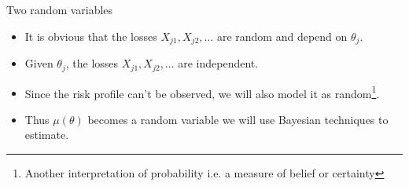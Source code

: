 \documentclass[11pt]{beamer}
\begin{document}
\begin{frame}{Two random variables}

\begin{itemize}
\item It is obvious that the losses $X_{j1},X_{j2},\ldots$ are random and depend on $\theta_j$.

\vfill


\item Given $\theta_j$, the losses $X_{j1},X_{j2},\ldots$ are independent.


\vfill



\item Since the risk profile can't be observed, we will also model it as random\footnote{Another interpretation of probability i.e. a measure of belief or certainty}.


\vfill



\item Thus $\mu(\theta)$  becomes a random variable we will use \alert{Bayesian} techniques to estimate.
\end{itemize}

\end{frame}
\end{document}

